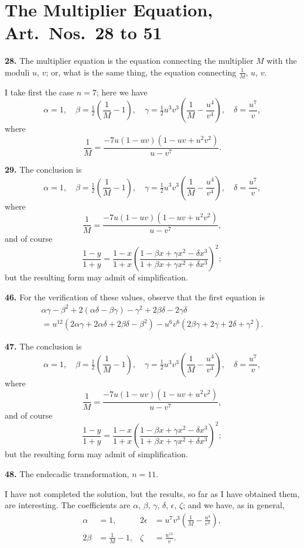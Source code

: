 \documentclass[11pt,a4paper]{book}
\begin{document}
\medskip




\section*{The Multiplier Equation, Art.~Nos.~28 to 51}

\textbf{28.} The multiplier equation is the equation connecting the multiplier $M$ with the moduli $u$, $v$; or, what is the same thing, the equation connecting $\frac{1}{M}$, $u$, $v$.

I take first the case $n = 7$; here we have
\[
\alpha = 1, \quad \beta = \tfrac{1}{2}\left(\frac{1}{M} - 1\right), \quad
\gamma = \tfrac{1}{2}u^3 v^3\left(\frac{1}{M} - \frac{u^4}{v^4}\right), \quad
\delta = \frac{u^7}{v},
\]
where
\[
\frac{1}{M} = \frac{-7u(1 - uv)(1 - uv + u^2 v^2)}{u - v^7}.
\]

\textbf{29.} The conclusion is
\[
\alpha = 1, \quad \beta = \tfrac{1}{2}\left(\frac{1}{M} - 1\right), \quad
\gamma = \tfrac{1}{2}u^3 v^3\left(\frac{1}{M} - \frac{u^4}{v^4}\right), \quad
\delta = \frac{u^7}{v},
\]
where
\[
\frac{1}{M} = \frac{-7u(1 - uv)(1 - uv + u^2 v^2)}{u - v^7},
\]
and of course
\[
\frac{1 - y}{1 + y} = \frac{1 - x}{1 + x}
\left(\frac{1 - \beta x + \gamma x^2 - \delta x^3}
{1 + \beta x + \gamma x^2 + \delta x^3}\right)^2;
\]
but the resulting form may admit of simplification.

\textbf{46.} For the verification of these values, observe that the first equation is
\begin{multline*}
\alpha\gamma - \beta^2 + 2(\alpha\delta - \beta\gamma) - \gamma^2 + 2\beta\delta - 2\gamma\delta \\
= u^{12}(2\alpha\gamma + 2\alpha\delta + 2\beta\delta - \beta^2) - u^6 v^6(2\beta\gamma + 2\gamma + 2\delta + \gamma^2).
\end{multline*}

\textbf{47.} The conclusion is
\[
\alpha = 1, \quad \beta = \tfrac{1}{2}\left(\frac{1}{M} - 1\right), \quad
\gamma = \tfrac{1}{2}u^3 v^3\left(\frac{1}{M} - \frac{u^4}{v^4}\right), \quad
\delta = \frac{u^7}{v},
\]
where
\[
\frac{1}{M} = \frac{-7u(1 - uv)(1 - uv + u^2 v^2)}{u - v^7},
\]
and of course
\[
\frac{1 - y}{1 + y} = \frac{1 - x}{1 + x}
\left(\frac{1 - \beta x + \gamma x^2 - \delta x^3}
{1 + \beta x + \gamma x^2 + \delta x^3}\right)^2;
\]
but the resulting form may admit of simplification.

\textbf{48.} The endecadic transformation, $n = 11$.

I have not completed the solution, but the results, so far as I have obtained them, are interesting. The coefficients are $\alpha$, $\beta$, $\gamma$, $\delta$, $\epsilon$, $\zeta$; and we have, as in general,
\begin{align*}
\alpha &= 1, & 2\epsilon &= u^7 v^3\left(\frac{1}{M} - \frac{u^4}{v^4}\right), \\
2\beta &= \frac{1}{M} - 1, & \zeta &= \frac{u^{11}}{v}.
\end{align*}
\end{document}
